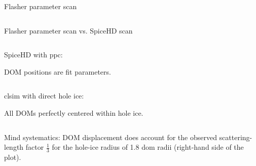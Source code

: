 
\begin{frame}[fragile]{Flasher parameter scan}
  \begin{column}{0.5\textwidth}
  \end{column}
  \begin{column}{0.5\textwidth}
  \end{column}

\end{frame}

\begin{frame}[fragile]{Flasher parameter scan vs. SpiceHD scan}
  \begin{column}{0.5\textwidth}
    SpiceHD with ppc: \medskip


    DOM positions are fit parameters.
  \end{column}
  \begin{column}{0.5\textwidth}
    clsim with direct hole ice: \medskip


    All DOMs perfectly centered within hole ice.
  \end{column}

  \bigskip
  Mind systematics: DOM displacement does account for the observed scattering-length factor $\frac{1}{3}$ for the hole-ice radius of 1.8 dom radii (right-hand side of the plot).

\end{frame}